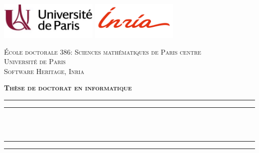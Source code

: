 \begin{titlingpage}
\begin{SingleSpace}
\calccentering{\unitlength}

\includegraphics[height=1.8cm]{frontmatter/uni_paris.jpg}  \hfill
\includegraphics[height=1.8cm]{frontmatter/inria.png} \hfill
{}

\begin{center}
\begin{otherlanguage}{french}

    \textsc{École doctorale 386: Sciences mathématiques de Paris centre}\\
\vspace{2mm}
\textsc{Université de Paris}\\
\vspace{2mm}
\textsc{Software Heritage, Inria}\\

\vspace{4mm}

\textsc{\Large \textbf{Thèse de doctorat en informatique}}\\

\vspace*{2mm}

\rule[0.5ex]{\linewidth}{2pt}\vspace*{-\baselineskip}\vspace*{3.2pt}
\rule[0.5ex]{\linewidth}{1pt}\\[\baselineskip]
\vspace{-0.35cm}
{\huge \thetitle{}}\\
\rule[0.5ex]{\linewidth}{1pt}\vspace*{-\baselineskip}\vspace*{3.4pt}
\rule[0.5ex]{\linewidth}{2pt}\\

\vspace{2mm}


\end{otherlanguage}
\end{center}
\end{SingleSpace}
\end{titlingpage}
